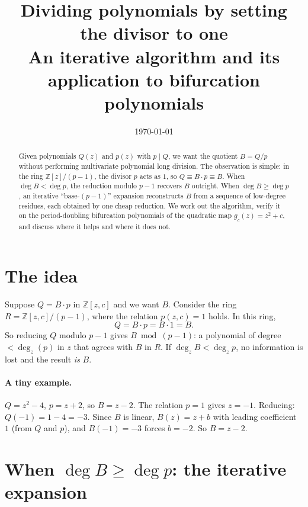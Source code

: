 \documentclass[11pt]{article}
\title{Dividing polynomials by setting the divisor to one\\
\large An iterative algorithm and its application to bifurcation polynomials}
\author{}
\date{\today}
\begin{document}
\maketitle

\begin{abstract}
Given polynomials $Q(z)$ and $p(z)$ with $p\mid Q$, we want the quotient
$B=Q/p$ without performing multivariate polynomial long division.  The
observation is simple: in the ring $\mathbb{Z}[z]/(p-1)$, the divisor $p$
acts as $1$, so $Q\equiv B\cdot p\equiv B$.  When $\deg B<\deg p$, the
reduction modulo $p-1$ recovers $B$ outright.  When $\deg B\ge\deg p$, an
iterative ``base-$(p{-}1)$'' expansion reconstructs $B$ from a sequence of
low-degree residues, each obtained by one cheap reduction.  We work out the
algorithm, verify it on the period-doubling bifurcation polynomials of the
quadratic map $g_c(z)=z^2+c$, and discuss where it helps and where it does
not.
\end{abstract}

\tableofcontents

\section{The idea}

Suppose $Q=B\cdot p$ in $\mathbb{Z}[z,c]$ and we want $B$.  Consider the
ring $R=\mathbb{Z}[z,c]/(p-1)$, where the relation $p(z,c)=1$ holds.  In
this ring,
\[
Q = B\cdot p = B\cdot 1 = B.
\]
So reducing $Q$ modulo $p-1$ gives $B \bmod (p-1)$: a polynomial of degree
$<\deg_z(p)$ in $z$ that agrees with $B$ in $R$.  If $\deg_z B<\deg_z p$,
no information is lost and the result \emph{is} $B$.

\paragraph{A tiny example.}
$Q=z^2-4$, $p=z+2$, so $B=z-2$.  The relation $p=1$ gives $z=-1$.
Reducing: $Q(-1)=1-4=-3$.  Since $B$ is linear, $B(z)=z+b$ with leading
coefficient $1$ (from $Q$ and $p$), and $B(-1)=-3$ forces $b=-2$.  So
$B=z-2$.

\section{When $\deg B\ge\deg p$: the iterative expansion}
\label{sec:iteration}
\end{document}
